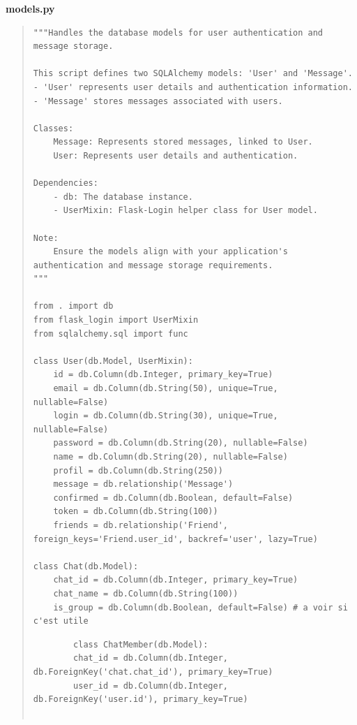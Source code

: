 \documentclass{article}
\begin{document}
\newpage
\textbf{models.py}
\vspace*{1\baselineskip}
\begin{quote}


\begin{tcolorbox}[colback=grisClair,colframe=black]
    \begin{lstlisting}
"""Handles the database models for user authentication and message storage.

This script defines two SQLAlchemy models: 'User' and 'Message'. 
- 'User' represents user details and authentication information.
- 'Message' stores messages associated with users.

Classes:
    Message: Represents stored messages, linked to User.
    User: Represents user details and authentication.

Dependencies:
    - db: The database instance.
    - UserMixin: Flask-Login helper class for User model.

Note:
    Ensure the models align with your application's authentication and message storage requirements.
"""

from . import db
from flask_login import UserMixin
from sqlalchemy.sql import func

class User(db.Model, UserMixin):
    id = db.Column(db.Integer, primary_key=True)
    email = db.Column(db.String(50), unique=True, nullable=False)
    login = db.Column(db.String(30), unique=True, nullable=False)
    password = db.Column(db.String(20), nullable=False)
    name = db.Column(db.String(20), nullable=False)
    profil = db.Column(db.String(250)) 
    message = db.relationship('Message')
    confirmed = db.Column(db.Boolean, default=False)
    token = db.Column(db.String(100))
    friends = db.relationship('Friend', foreign_keys='Friend.user_id', backref='user', lazy=True)

class Chat(db.Model):
    chat_id = db.Column(db.Integer, primary_key=True)
    chat_name = db.Column(db.String(100))
    is_group = db.Column(db.Boolean, default=False) # a voir si c'est utile

    \end{lstlisting}       
\end{tcolorbox}


\begin{tcolorbox}[colback=grisClair,colframe=black]
    \begin{lstlisting}
        class ChatMember(db.Model):
        chat_id = db.Column(db.Integer, db.ForeignKey('chat.chat_id'), primary_key=True)
        user_id = db.Column(db.Integer, db.ForeignKey('user.id'), primary_key=True)
      

\end{lstlisting}
\end{tcolorbox}
\end{quote}
\end{document}
